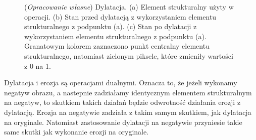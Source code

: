 \documentclass{article}
\begin{document}
        \begin{figure}[H]
            \centering
            \qquad
            \qquad
            \caption
            {
                (\textit{Opracowanie własne}) Dylatacja.
                (a) Element strukturalny użyty w operacji.
                (b) Stan przed dylatacją z wykorzystaniem elementu strukturalnego z podpunktu (a).
                (c) Stan po dylatacji z wykorzystaniem elementu strukturalnego z podpunktu (a).
                Granatowym kolorem zaznaczono punkt centralny elementu strukturalnego, natomiast zielonym piksele, które zmieniły wartości z 0 na 1.
            }
            \label{dylatacja}
        \end{figure}

        {
            \Large
            \justifying
            \quad
            Dylatacja i erozja są operacjami dualnymi.
            Oznacza to, że jeżeli wykonamy negatyw obrazu, a nastepnie zadziałamy identycznym elementem strukturalnym na negatyw, to skutkiem takich działań będzie odwrotność działania erozji z dylatacją.
            Erozja na negatywie zadziała z takim samym skutkiem, jak dylatacja na oryginale.
            Natomiast zastosowanie dylatacji na negatywie przyniesie takie same skutki jak wykonanie erozji na oryginale.
        }

        \vspace{0.5cm}
\end{document}
